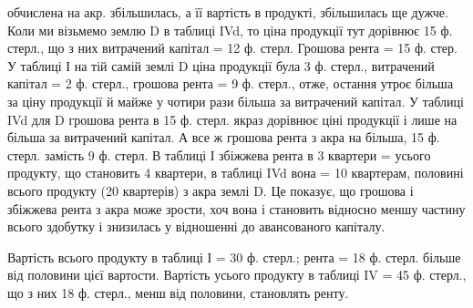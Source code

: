 обчислена на акр. збільшилась, а її вартість в продукті, збільшилась ще дужче.
Коли ми візьмемо землю D в таблиці IVd, то ціна продукції тут дорівнює
15 ф. стерл., що з них витрачений капітал = 12 ф. стерл. Грошова рента = 15
ф. стер. У таблиці І на тій самій землі D ціна продукції була 3 ф. стерл., витрачений
капітал = 2 ф. стерл., грошова рента = 9 ф. стерл., отже, остання
утроє більша за ціну продукції й майже у чотири рази більша за витрачений
капітал. У таблиці IVd для D грошова рента в 15 ф. стерл. якраз дорівнює ціні
продукції і лише на   більша за витрачений капітал. А все ж грошова рента
з акра на   більша, 15 ф. стерл. замість 9 ф. стерл. В таблиці І збіжжева
рента в 3 квартери =   усього продукту, що становить 4 квартери, в таблиці
IVd вона = 10 квартерам, половині всього продукту (20 квартерів) з акра
землі D. Це показує, що грошова і збіжжева рента з акра може зрости, хоч
вона і становить відносно меншу частину всього здобутку і знизилась у відношенні
до авансованого капіталу.

Вартість всього продукту в таблиці І = 30 ф. стерл.; рента = 18 ф.
стерл. більше від половини цієї вартости. Вартість усього продукту в таблиці
IV = 45 ф. стерл., що з них 18 ф. стерл., менш від половини, становлять
ренту.
